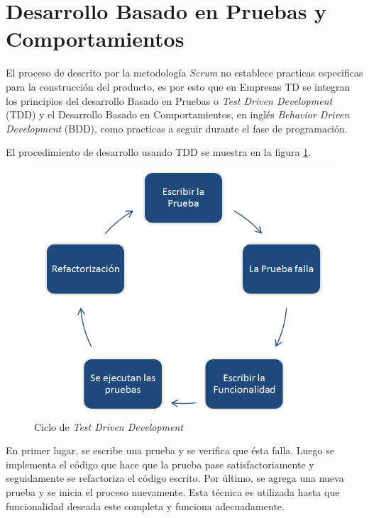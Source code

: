 \section{Desarrollo Basado en Pruebas y Comportamientos} \label{sect:TDD_BDD}

El proceso de descrito por la metodología \textit{Scrum} no establece practicas especificas para la construcción del producto, es por esto que en Empresas TD se integran los principios del desarrollo Basado en Pruebas o \textit{Test Driven Development} (TDD)  y el Desarrollo Basado en Comportamientos, en inglés \textit{Behavior Driven Development} (BDD), como practicas a seguir durante el fase de programación. 

El procedimiento de desarrollo usando TDD se muestra en la figura \ref{img:tdd}.

\begin{figure}[h]
	\begin{center}
		\includegraphics[scale=0.7]{imagenes/tdd.png}
	\end{center}
	\caption{
		\label{img:tdd}
		Ciclo de \textit{Test Driven Development}
	}
\end{figure}

En primer lugar, se escribe una prueba y se verifica que ésta falla. Luego se implementa el código que hace que la prueba pase satisfactoriamente y seguidamente se refactoriza el código escrito. Por último, se agrega una nueva prueba y se inicia el proceso nuevamente. Esta técnica es utilizada hasta que funcionalidad deseada este completa y funciona adecuadamente. 


